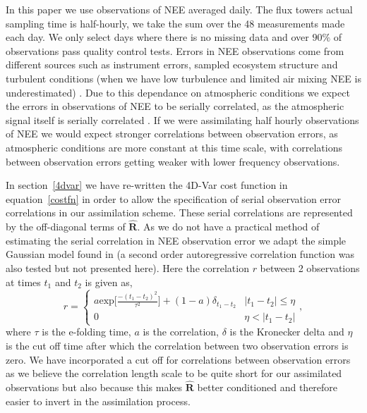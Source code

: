 \documentclass[11pt]{article}
\begin{document}
In this paper we use observations of NEE averaged daily. The flux towers actual sampling time is half-hourly, we take the sum over the 48 measurements made each day. We only select days where there is no missing data and over $90\% $ of observations pass quality control tests. Errors in NEE observations come from different sources such as instrument errors, sampled ecosystem structure and turbulent conditions (when we have low turbulence and limited air mixing NEE is underestimated) \citep{Papale2006}. Due to this dependance on atmospheric conditions we expect the errors in observations of NEE to be serially correlated, as the atmospheric signal itself is serially correlated \citep{Daley1992}. If we were assimilating half hourly observations of NEE we would expect stronger correlations between observation errors, as atmospheric conditions are more constant at this time scale, with correlations between observation errors getting weaker with lower frequency observations. 

In section~\ref{4dvar} we have re-written the 4D-Var cost function in equation~\ref{costfn} in order to allow the specification of serial observation error correlations in our assimilation scheme. These serial correlations are represented by the off-diagonal terms of $\hat{\mathbf{R}}$. As we do not have a practical method of estimating the serial correlation in NEE observation error we adapt the simple Gaussian model found in \citet{jarvinen1999variational} (a second order autoregressive correlation function was also tested but not presented here). Here the correlation $r$ between 2 observations at times $t_1$ and $t_2$ is given as,
\begin{equation}
r =
\begin{cases} 
      a \text{exp} \bigg[ \frac{-(t_1 - t_2)^2}{\tau^2} \bigg] + (1- a)\delta_{t_1 - t_2} & |t_1 - t_2| \leq \eta \\
      0 & \eta < |t_1 - t_2| 
   \end{cases}
   , \label{eqn:corr_fn}
\end{equation}
where $\tau$ is the e-folding time, $a$ is the correlation, $\delta$ is the Kronecker delta and $\eta$ is the cut off time after which the correlation between two observation errors is zero. We have incorporated a cut off for correlations between observation errors as we believe the correlation length scale to be quite short for our assimilated observations but also because this makes $\hat{\mathbf{R}}$ better conditioned and therefore easier to invert in the assimilation process. 
\end{document}
